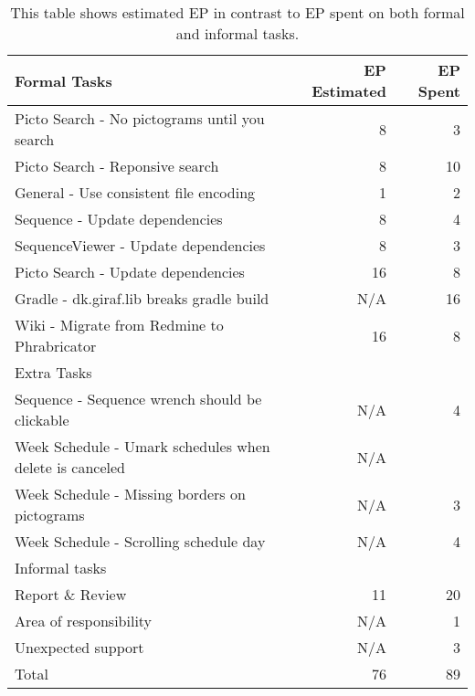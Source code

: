 \begin{table}[h]
    {\setlength{\extrarowheight}{1ex}%
    \begin{tabularx}{\textwidth}{X|r|r}
        \toprule
        Formal Tasks                                                  & EP Estimated & EP Spent     \\
        \midrule
        Picto Search - No pictograms until you search                 & 8            & 3            \\
        Picto Search - Reponsive search                               & 8            & 10           \\
        General - Use consistent file encoding                        & 1            & 2            \\
        Sequence - Update dependencies                                & 8            & 4            \\
        SequenceViewer - Update dependencies                          & 8            & 3            \\
        Picto Search - Update dependencies                            & 16           & 8            \\
        Gradle - dk.giraf.lib breaks gradle build                     & N/A          & 16           \\
        Wiki - Migrate from Redmine to Phrabricator                   & 16           & 8            \\
        \toprule
        Extra Tasks                                                   &              &              \\
        \midrule
        Sequence - Sequence wrench should be clickable                & N/A          & 4            \\
        Week Schedule - Umark schedules when delete is canceled       & N/A          &              \\
        Week Schedule - Missing borders on pictograms                 & N/A          & 3            \\
        Week Schedule - Scrolling schedule day                        & N/A          & 4            \\
        \toprule
        Informal tasks                                                &              &              \\
        \midrule
        Report \& Review                                              & 11           & 20           \\      %
        Area of responsibility                                        & N/A          & 1            \\
        Unexpected support                                            & N/A          & 3            \\
        \midrule
        Total                                                         & 76           & 89           \\
        \bottomrule
    \end{tabularx}}
    \caption{This table shows estimated EP in contrast to EP spent on both formal and informal tasks.}
    \label{tab:sprint1tasktable}
\end{table}
